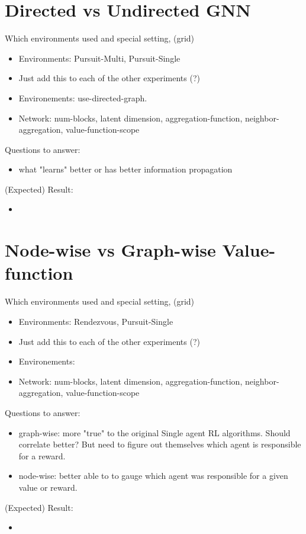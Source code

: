 \section{Directed vs Undirected GNN}
\label{sec:Directed vs Undirected GNN}
Which environments used and special setting, (grid)
\begin{itemize}[noitemsep,nolistsep]
    \item Environments: Pursuit-Multi, Pursuit-Single
    \item Just add this to each of the other experiments (?)
    \item Environements: use-directed-graph.
    \item Network: num-blocks, latent dimension, aggregation-function, neighbor-aggregation, value-function-scope
\end{itemize}
Questions to answer:
\begin{itemize}[noitemsep,nolistsep]
    \item what "learns" better or has better information propagation
\end{itemize}
(Expected) Result:
\begin{itemize}[noitemsep,nolistsep]
    \item 
\end{itemize}


\section{Node-wise vs Graph-wise Value-function}
\label{sec:Node-wise vs Graph-wise Value-function}
Which environments used and special setting, (grid)
\begin{itemize}[noitemsep,nolistsep]
    \item Environments: Rendezvous, Pursuit-Single
    \item Just add this to each of the other experiments (?)
    \item Environements: 
    \item Network: num-blocks, latent dimension, aggregation-function, neighbor-aggregation, value-function-scope
\end{itemize}
Questions to answer:
\begin{itemize}[noitemsep,nolistsep]
    \item graph-wise: more "true" to the original Single agent RL algorithms. Should correlate better? But need to figure out themselves which agent is responsible for a reward.
    \item node-wise: better able to to gauge which agent was responsible for a given value or reward. 
\end{itemize}
(Expected) Result:
\begin{itemize}[noitemsep,nolistsep]
    \item 
\end{itemize}
\fi